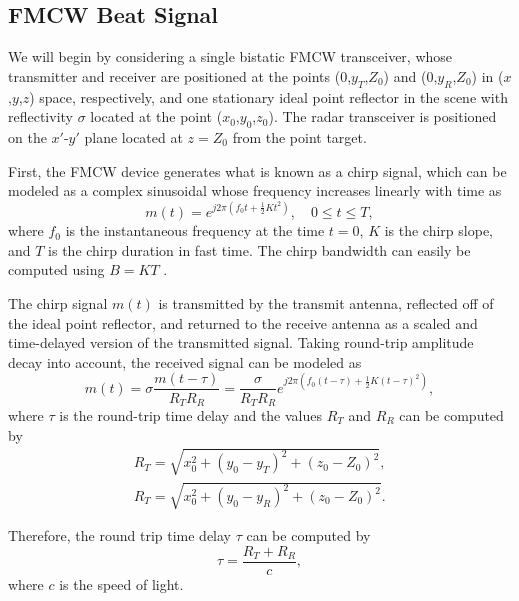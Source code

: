 \documentclass{ieeeaccess}
\begin{document}
\subsection{FMCW Beat Signal}
\label{subsec:fmcw_beat_signal}
We will begin by considering a single bistatic FMCW transceiver, whose transmitter and receiver are positioned at the points ($0$,$y_T$,$Z_0$) and ($0$,$y_R$,$Z_0$) in ($x$,$y$,$z$) space, respectively, and one stationary ideal point reflector in the scene with reflectivity $\sigma$ located at the point ($x_0$,$y_0$,$z_0$). The radar transceiver is positioned on the $x'$-$y'$ plane located at $z = Z_0$ from the point target.

First, the FMCW device generates what is known as a chirp signal, which can be modeled as a complex sinusoidal whose frequency increases linearly with time as
\begin{equation}
    m(t) = e^{j2\pi(f_0t + \frac{1}{2}Kt^2)}, \quad 0 \leq t \leq T,
\end{equation}
where $f_0$ is the instantaneous frequency at the time $t=0$, $K$ is the chirp slope, and $T$ is the chirp duration in fast time. The chirp bandwidth can easily be computed using $B = KT$ \cite{Yanik:ConcealedItemImaging}.

The chirp signal $m(t)$ is transmitted by the transmit antenna, reflected off of the ideal point reflector, and returned to the receive antenna as a scaled and time-delayed version of the transmitted signal. Taking round-trip amplitude decay into account, the received signal can be modeled as
\begin{equation}
    \hat{m}(t) = \sigma \frac{m(t-\tau)}{R_T R_R} = \frac{\sigma}{R_T R_R} e^{j2\pi(f_0(t-\tau) + \frac{1}{2}K(t-\tau)^2)},
\end{equation}
where $\tau$ is the round-trip time delay \cite{Yanik:MillimeterWaveNearFieldImaging} and the values $R_T$ and $R_R$ can be computed by
\begin{gather}
    R_T = \sqrt{x_0^2 + (y_0-y_T)^2+(z_0-Z_0)^2}, \\
    R_T = \sqrt{x_0^2 + (y_0-y_R)^2+(z_0-Z_0)^2}.
\end{gather}

Therefore, the round trip time delay $\tau$ can be computed by
\begin{equation}
    \tau = \frac{R_T+R_R}{c},
\end{equation}
where $c$ is the speed of light.
\end{document}

